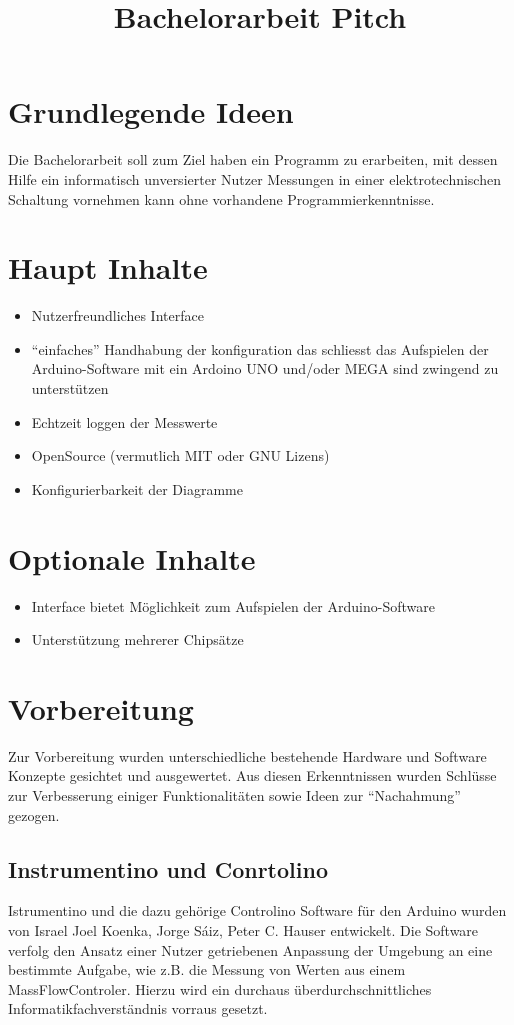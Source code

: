 \documentclass[a4paper,10pt]{article}
\title{Bachelorarbeit Pitch}
\author{}
\date{}
\begin{document}
\maketitle
\newpage
\tableofcontents
\newpage
\section{Grundlegende Ideen}
Die Bachelorarbeit soll zum Ziel haben ein Programm zu erarbeiten, mit dessen 
Hilfe ein informatisch unversierter Nutzer Messungen in einer 
elektrotechnischen Schaltung vornehmen kann ohne vorhandene 
Programmierkenntnisse.

\section{Haupt Inhalte}
\begin{itemize}
 \item Nutzerfreundliches Interface
 \item ``einfaches'' Handhabung der konfiguration
  \subitem das schliesst das Aufspielen der Arduino-Software mit ein
  \subitem Ardoino UNO und/oder MEGA sind zwingend zu unterstützen
 \item Echtzeit loggen der Messwerte
 \item OpenSource (vermutlich MIT oder GNU Lizens)
 \item Konfigurierbarkeit der Diagramme
\end{itemize}

\section{Optionale Inhalte}
\begin{itemize}
 \item Interface bietet Möglichkeit zum Aufspielen der Arduino-Software
 \item Unterstützung mehrerer Chipsätze
\end{itemize}

\section{Vorbereitung}
Zur Vorbereitung wurden unterschiedliche bestehende Hardware und Software 
Konzepte gesichtet und ausgewertet. Aus diesen Erkenntnissen wurden Schlüsse 
zur Verbesserung einiger Funktionalitäten sowie Ideen zur ``Nachahmung'' 
gezogen.
\subsection{Instrumentino und Conrtolino}
Istrumentino und die dazu gehörige Controlino Software für den Arduino wurden 
von Israel Joel Koenka, Jorge Sáiz, Peter C. Hauser entwickelt. Die Software 
verfolg den Ansatz einer Nutzer getriebenen Anpassung der Umgebung an eine 
bestimmte Aufgabe, wie z.B. die Messung von Werten aus einem MassFlowControler.
Hierzu wird ein durchaus überdurchschnittliches Informatikfachverständnis 
vorraus gesetzt.
\end{document}
